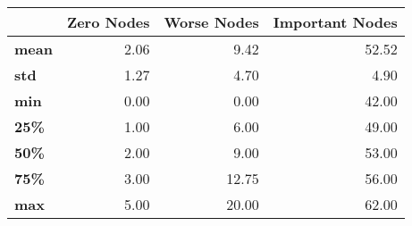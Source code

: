 \begin{tabular}{lrrr}
\toprule
{} &  Zero Nodes &  Worse Nodes &  Important Nodes \\
\midrule
\textbf{mean} &        2.06 &         9.42 &            52.52 \\
\textbf{std } &        1.27 &         4.70 &             4.90 \\
\textbf{min } &        0.00 &         0.00 &            42.00 \\
\textbf{25\% } &        1.00 &         6.00 &            49.00 \\
\textbf{50\% } &        2.00 &         9.00 &            53.00 \\
\textbf{75\% } &        3.00 &        12.75 &            56.00 \\
\textbf{max } &        5.00 &        20.00 &            62.00 \\
\bottomrule
\end{tabular}
